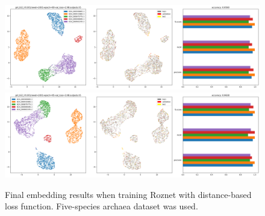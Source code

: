 \documentclass{article}
\begin{document}
\begin{figure}
  \includegraphics[width=\linewidth]{new_journal/figures/ar122_r89.genomic.small/ddp/g4_b32_lr0.001/seed=2001-epoch=80-val_loss=2.98.outputs.png}
  \includegraphics[width=\linewidth]{new_journal/figures/ar122_r89.genomic.small/ddp/g4_b32_lr0.001/seed=2001-epoch=95-val_loss=3.98.outputs.png}
  \caption{Final embedding results when training Roznet with distance-based loss function. Five-species archaea dataset was used.  }
  \label{fig:g4_b32_lr0.001}
\end{figure}
\end{document}
